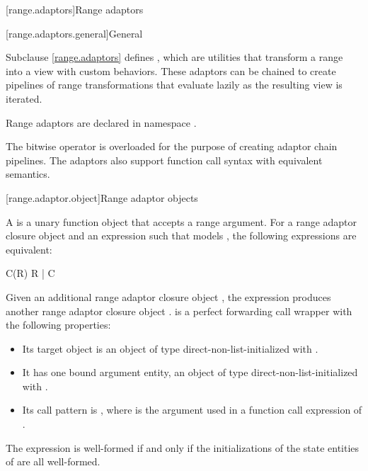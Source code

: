 [range.adaptors]{Range adaptors}

[range.adaptors.general]{General}

\pnum
Subclause \ref{range.adaptors} defines , which are utilities that transform a
range into a view with custom behaviors. These
adaptors can be chained to create pipelines of range transformations that
evaluate lazily as the resulting view is iterated.

\pnum
Range adaptors are declared in namespace .

\pnum
The bitwise  operator is overloaded for the purpose of creating adaptor chain
pipelines. The adaptors also support function call syntax with equivalent
semantics.

\pnum
\begin{example}
\end{example}

[range.adaptor.object]{Range adaptor objects}

%
\pnum
A  is a unary function object that accepts
a range argument. For
a range adaptor closure object  and an expression  such that
 models , the following
expressions are equivalent:
\begin{codeblock}
C(R)
R | C
\end{codeblock}
Given an additional range adaptor closure object ,
the expression  produces another range adaptor
closure object .
 is a perfect forwarding call wrapper
with the following properties:
\begin{itemize}
\item
Its target object is an object  of type 
direct-non-list-initialized with .
\item
It has one bound argument entity,
an object  of type 
direct-non-list-initialized with .
\item
Its call pattern is ,
where  is the argument used in
a function call expression of .
\end{itemize}
The expression  is well-formed if and only if
the initializations of the state entities of  are all well-formed.

